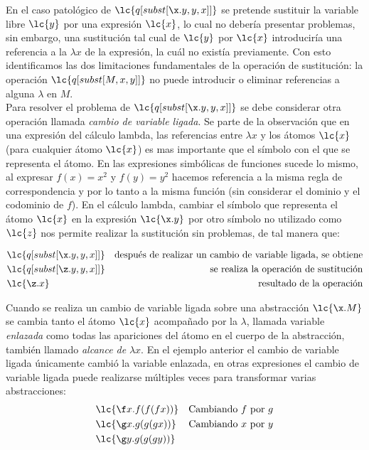 En el caso patológico de \(\lc{q[subst[\x.y,y,x]]}\) se pretende sustituir la
variable libre \(\lc{y}\) por una expresión \(\lc{x}\), lo cual no debería
presentar problemas, sin embargo, una sustitución tal cual de \(\lc{y}\) por
\(\lc{x}\) introduciría una referencia a la \(\lambda x\) de la expresión, la
cuál no existía previamente. Con esto identificamos las dos limitaciones
fundamentales de la operación de sustitución: la operación
\(\lc{q[subst[M,x,y]]}\) no puede introducir o eliminar referencias a alguna
\(\lambda\) en \(M\). \\

Para resolver el problema de \(\lc{q[subst[\x.y,y,x]]}\) se debe considerar otra
operación llamada \emph{cambio de variable ligada}. Se parte de la observación
que en una expresión del cálculo lambda, las referencias entre \(\lambda x\) y
los átomos \(\lc{x}\) (para cualquier átomo \(\lc{x}\)) es mas importante que el
símbolo con el que se representa el átomo. En las expresiones simbólicas de
funciones sucede lo mismo, al expresar \(f(x)=x^{2}\) y \(f(y)=y^{2}\) hacemos
referencia a la misma regla de correspondencia y por lo tanto a la misma función
(sin considerar el dominio y el codominio de \(f\)). En el cálculo lambda,
cambiar el símbolo que representa el átomo \(\lc{x}\) en la expresión
\(\lc{\x.y}\) por otro símbolo no utilizado como \(\lc{z}\) nos permite realizar
la sustitución sin problemas, de tal manera que:

\begin{align*}
  &\lc{q[subst[\x.y,y,x]]} &\text{después de realizar un cambio de variable ligada, se obtiene} \\
  &\lc{q[subst[\z.y,y,x]]} &\text{se realiza la operación de sustitución} \\
  &\lc{\z.x}               &\text{resultado de la operación}
\end{align*}

Cuando se realiza un cambio de variable ligada sobre una abstracción
\(\lc{\x.M}\) se cambia tanto el átomo \(\lc{x}\) acompañado por la \(\lambda\),
llamada variable \emph{enlazada} como todas las apariciones del átomo
en el cuerpo de la abstracción, también llamado \emph{alcance de} \(\lambda x\).
En el ejemplo anterior el cambio de variable ligada únicamente cambió la
variable enlazada, en otras expresiones el cambio de variable ligada
puede realizarse múltiples veces para transformar varias abstracciones: \\

\begin{align*}
  &\lc{\f x.f(f(f x))} &\text{Cambiando \(f\) por \(g\)} \\
  &\lc{\g x.g(g(g x))} &\text{Cambiando \(x\) por \(y\)} \\
  &\lc{\g y.g(g(g y))} & \\
\end{align*}

